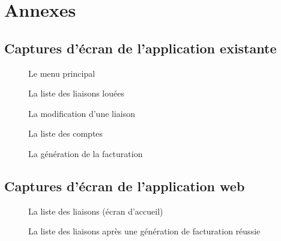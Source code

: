 \documentclass[a4paper,french,12pt]{article}
\begin{document}
	

\section{Annexes}
	\subsection{Captures d'écran de l'application existante}
	\newpage
		\begin{figure}[h!]
			\caption{Le menu principal}
			\centering
		\end{figure} 
		
		\begin{figure}[h!]
			\caption{La liste des liaisons louées}
			\centering
		\end{figure}
		
		\begin{figure}[h!]
			\caption{La modification d'une liaison}
			\centering
		\end{figure} 
		
		\begin{figure}[h!]
			\caption{La liste des comptes}
			\centering
		\end{figure} 

		\begin{figure}[h!]
			\caption{La génération de la facturation}
			\centering
		\end{figure} 
			
		
		\newpage
		
		
		\subsection{Captures d'écran de l'application web}
		\newpage
		\begin{figure}[h!]
			\caption{La liste des liaisons (écran d'accueil)}
			\centering
		\end{figure} 
		
		\begin{figure}[h!]
			\caption{La liste des liaisons après une génération de facturation réussie}
			\centering
		\end{figure} 
		
\end{document}
